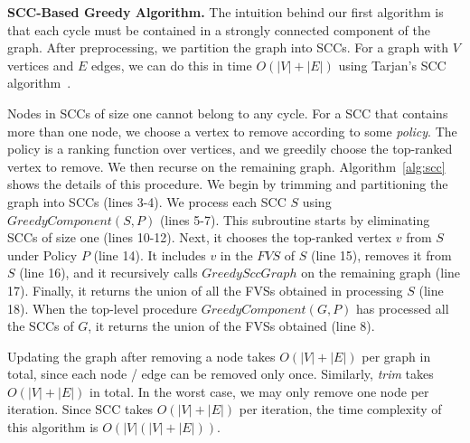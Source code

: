 \begin{algorithm}[t]
\SetAlgoLined\DontPrintSemicolon
{}
\caption{Sort-based greedy algorithm}
\label{alg:sort}
\end{algorithm}




{\bf SCC-Based Greedy Algorithm.} The intuition behind our first algorithm is that each cycle must be contained in a strongly connected component of the graph. After preprocessing, we partition the graph into SCCs. For a graph with $V$ vertices and $E$ edges, we can do this in time $O(|V|+|E|)$ using Tarjan's SCC algorithm~\cite{tarjan1972depth}.

Nodes in SCCs of size one cannot belong to any cycle. For a SCC that contains
more than one node, we choose a vertex to remove according to some \emph{policy}. The policy is a ranking function over vertices, and we greedily choose the top-ranked vertex to remove. We then recurse on the remaining graph. Algorithm~\ref{alg:scc} shows the details of this procedure. We begin by trimming and partitioning the graph into SCCs  (lines 3-4). We process each SCC $S$ using $GreedyComponent(S, P)$ (lines 5-7). This subroutine starts by eliminating SCCs of size one (lines 10-12). Next, it chooses the top-ranked vertex $v$ from $S$ under Policy $P$ (line 14). It includes $v$ in the $FVS$ of $S$ (line 15), removes it from $S$ (line 16), and it recursively calls $GreedySccGraph$ on the remaining graph (line 17). Finally, it returns the union of all the FVSs obtained in processing $S$ (line 18). When the top-level procedure $GreedyComponent(G, P)$ has processed all the SCCs of $G$, it returns the union of the FVSs obtained (line 8).

Updating the graph after removing a node takes $O(|V| + |E|)$ per
graph in total, since each node / edge can be removed only once. Similarly, \emph{trim} takes $O(|V| + |E|)$ in total. In the worst case, we may only remove one node per iteration. Since SCC takes $O(|V|+|E|)$ per iteration, the time complexity of this algorithm is $O(|V|(|V|+|E|))$.

